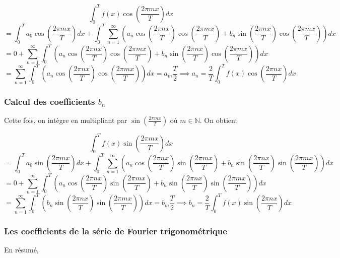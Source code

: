 \begin{equation*}
    \int_{0}^{T}f(x)\cos(\frac{2\pi m x}{T})dx
\end{equation*}
\begin{equation*}
    = \int_{0}^{T}a_0\cos(\frac{2\pi m x}{T})dx + \int_{0}^{T}\sum_{n=1}^{\infty}\left(a_n\cos(\frac{2\pi n x}{T})\cos(\frac{2\pi m x}{T}) + b_n\sin(\frac{2\pi n x}{T})\cos(\frac{2\pi m x}{T})\right)dx
\end{equation*}
\begin{equation*}
    = 0 + \sum_{n=1}^{\infty}\int_{0}^{T}\left(a_n\cos(\frac{2\pi n x}{T})\cos(\frac{2\pi m x}{T}) + b_n\sin(\frac{2\pi n x}{T})\cos(\frac{2\pi m x}{T})\right)dx
\end{equation*}
\begin{equation*}
    = \sum_{n=1}^{\infty}\int_{0}^{T}\left(a_n\cos(\frac{2\pi n x}{T})\cos(\frac{2\pi m x}{T})\right)dx = a_m\frac{T}{2} \implies a_n = \frac{2}{T}\int_{0}^{T}f(x)\cos(\frac{2\pi n x}{T})dx
\end{equation*}

\subsubsection{Calcul des coefficients $b_n$}
Cette fois, on intègre en multipliant par $\sin(\frac{2\pi m x}{T})$ où $m \in \mathbb{N}$. On obtient 

\begin{equation*}
    \int_{0}^{T}f(x)\sin(\frac{2\pi m x}{T})dx
\end{equation*}
\begin{equation*}
    = \int_{0}^{T}a_0\sin(\frac{2\pi m x}{T})dx + \int_{0}^{T}\sum_{n=1}^{\infty}\left(a_n\cos(\frac{2\pi n x}{T})\sin(\frac{2\pi m x}{T}) + b_n\sin(\frac{2\pi n x}{T})\sin(\frac{2\pi m x}{T})\right)dx
\end{equation*}
\begin{equation*}
    = 0 + \sum_{n=1}^{\infty}\int_{0}^{T}\left(a_n\cos(\frac{2\pi n x}{T})\sin(\frac{2\pi m x}{T}) + b_n\sin(\frac{2\pi n x}{T})\sin(\frac{2\pi m x}{T})\right)dx
\end{equation*}
\begin{equation*}
    = \sum_{n=1}^{\infty}\int_{0}^{T}\left(b_n\sin(\frac{2\pi n x}{T})\sin(\frac{2\pi m x}{T})\right)dx = b_m\frac{T}{2} \implies b_n = \frac{2}{T}\int_{0}^{T}f(x)\sin(\frac{2\pi n x}{T})dx
\end{equation*}

\subsubsection{Les coefficients de la série de Fourier trigonométrique}
En résumé, 

